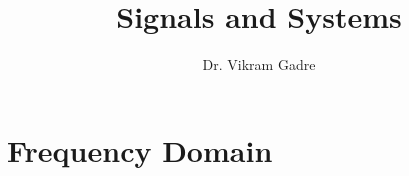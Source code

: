 \documentclass{scrbook}
\title{\Huge Signals and Systems}
\author{\Large Dr. Vikram Gadre}
\newcommand{\blankpage}{\newpage\hbox{}\thispagestyle{empty}\newpage}
\begin{document}
\frontmatter

\maketitle

\begin{comment}
\newpage
\begin{fullwidth}
~\vfill
\thispagestyle{empty}
\setlength{\parindent}{0pt}
\setlength{\parskip}{\baselineskip}
Copyright \copyright\ \the\year\ \thanklessauthor

\par\smallcaps{Published by \thanklesspublisher}

\par\smallcaps{tufte-latex.googlecode.com}

\par Licensed under the Apache License, Version 2.0 (the ``License''); you may not
use this file except in compliance with the License. You may obtain a copy
of the License at \url{http://www.apache.org/licenses/LICENSE-2.0}. Unless
required by applicable law or agreed to in writing, software distributed
under the License is distributed on an \smallcaps{``AS IS'' BASIS, WITHOUT
WARRANTIES OR CONDITIONS OF ANY KIND}, either express or implied. See the
License for the specific language governing permissions and limitations
under the License.\index{license}

\end{fullwidth}
\end{comment}
\tableofcontents

\listoffigures

\listoftables

\begin{comment}
\cleardoublepage
~\vfill
\begin{doublespace}
\noindent\fontsize{18}{22}\selectfont\itshape
\nohyphenation
Dedicated to those who appreciate \LaTeX{} 
and the work of \mbox{Edward R.~Tufte} 
and \mbox{Donald E.~Knuth}.
\end{doublespace}
\vfill
\vfill
\end{comment}

\cleardoublepage
\mainmatter

\part{Frequency Domain}

\end{document}
